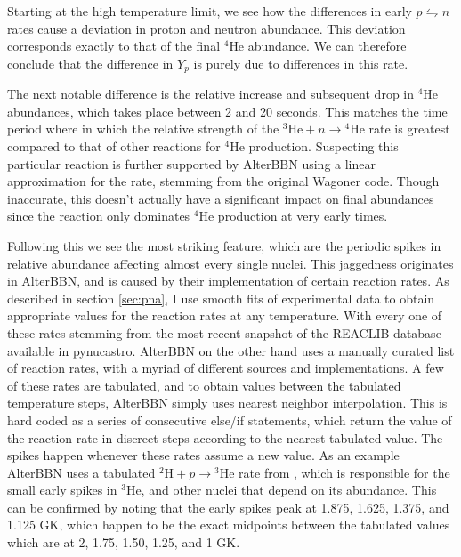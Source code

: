 Starting at the high temperature limit, we see how the differences in early $p\leftrightharpoons n$ rates cause a deviation in proton and neutron abundance. This deviation corresponds exactly to that of the final ${}^4$He abundance. We can therefore conclude that the difference in $Y_p$ is purely due to differences in this rate. 

The next notable difference is the relative increase and subsequent drop in ${}^4\text{He}$ abundances, which takes place between 2 and 20 seconds. This matches the time period where in which the relative strength of the ${}^3\text{He}+n\rightarrow {}^4\text{He}$ rate is greatest compared to that of other reactions for ${}^4$He production. Suspecting this particular reaction is further supported by AlterBBN using a linear approximation for the rate, stemming from the original Wagoner code\cite{Wagoner69}. Though inaccurate, this doesn't actually have a significant impact on final abundances since the reaction only dominates ${}^4\text{He}$ production at very early times. 

Following this we see the most striking feature, which are the periodic spikes in relative abundance affecting almost every single nuclei. This jaggedness originates in AlterBBN, and is caused by their implementation of certain reaction rates. As described in section \ref{sec:pna}, I use smooth fits of experimental data to obtain appropriate values for the reaction rates at any temperature. With every one of these rates stemming from the most recent snapshot of the REACLIB database\cite{REACLIB} available in pynucastro\cite{pynucastro2}. AlterBBN on the other hand uses a manually curated list of reaction rates, with a myriad of different sources and implementations. A few of these rates are tabulated, and to obtain values between the tabulated temperature steps, AlterBBN simply uses nearest neighbor interpolation. This is hard coded as a series of consecutive else/if statements, which return the value of the reaction rate in discreet steps according to the nearest tabulated value. The spikes happen whenever these rates assume a new value. As an example AlterBBN uses a tabulated ${}^2\text{H}+p\rightarrow {}^3\text{He}$ rate from \textcite{Coc_et_al_2015}, which is responsible for the small early spikes in ${}^3\text{He}$, and other nuclei that depend on its abundance. This can be confirmed by noting that the early spikes peak at 1.875, 1.625, 1.375, and 1.125 GK, which happen to be the exact midpoints between the tabulated values which are at 2, 1.75, 1.50, 1.25, and 1 GK. 


